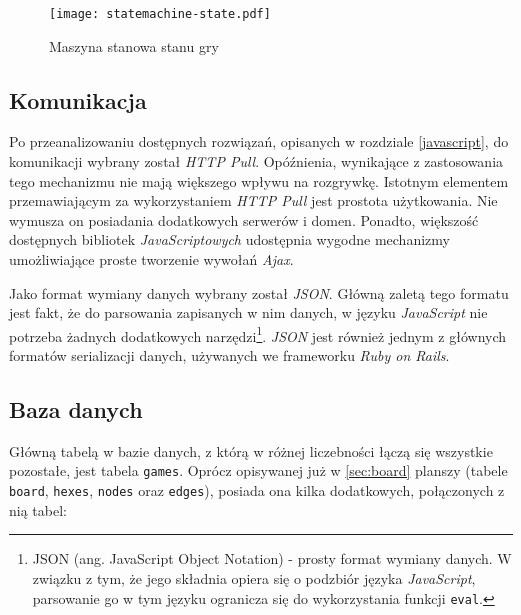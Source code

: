 \documentclass[a4paper,12pt]{article}
\begin{document}
\begin{figure}[ht]
  \begin{center}
    \texttt{[image: statemachine-state.pdf]}
  \end{center}
  \caption{Maszyna stanowa stanu gry}
  \label{statemachine-state}
\end{figure}

\subsection{Komunikacja}

Po przeanalizowaniu dostępnych rozwiązań, opisanych w rozdziale
\ref{javascript}, do komunikacji wybrany został \emph{HTTP
  Pull}. Opóźnienia, wynikające z zastosowania tego mechanizmu nie
mają większego wpływu na rozgrywkę. Istotnym elementem przemawiającym
za wykorzystaniem \emph{HTTP Pull} jest prostota użytkowania. Nie
wymusza on posiadania dodatkowych serwerów i domen. Ponadto, większość
dostępnych bibliotek \emph{JavaScriptowych} udostępnia wygodne
mechanizmy umożliwiające proste tworzenie wywołań \emph{Ajax}.

Jako format wymiany danych wybrany został \emph{JSON}. Główną zaletą
tego formatu jest fakt, że do parsowania zapisanych w nim danych, w
języku \emph{JavaScript} nie potrzeba żadnych dodatkowych
narzędzi\footnote{JSON (ang. JavaScript Object Notation) - prosty
  format wymiany danych. W związku z tym, że jego składnia opiera się
  o podzbiór języka \emph{JavaScript}, parsowanie go w tym języku
  ogranicza się do wykorzystania funkcji \texttt{eval}.}. \emph{JSON}
jest również jednym z głównych formatów serializacji danych, używanych
we frameworku \emph{Ruby on Rails}.

\subsection{Baza danych}
Główną tabelą w bazie danych, z którą w różnej liczebności łączą się
wszystkie pozostałe, jest tabela \texttt{games}. Oprócz opisywanej już
w \ref{sec:board} planszy (tabele \texttt{board}, \texttt{hexes},
\texttt{nodes} oraz \texttt{edges}), posiada ona kilka dodatkowych,
połączonych z nią tabel:
\end{document}
